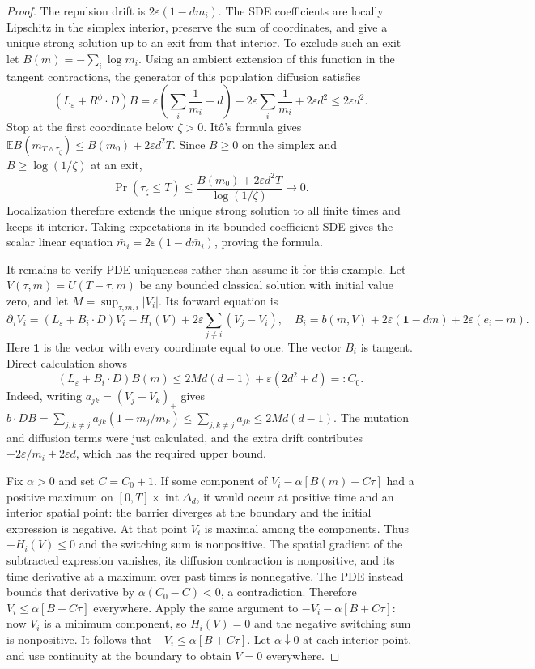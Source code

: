 \documentclass[11pt,a4paper]{article}
\theoremstyle{definition}
\theoremstyle{remark}
\begin{document}
\begin{proof}
The repulsion drift is $2\varepsilon(1-dm_i)$. The SDE coefficients are locally Lipschitz in the simplex interior, preserve the sum of coordinates, and give a unique strong solution up to an exit from that interior. To exclude such an exit let $B(m)=-\sum_i\log m_i$. Using an ambient extension of this function in the tangent contractions, the generator of this population diffusion satisfies
\[
 (L_\varepsilon+R^\phi\cdot D)B
 =\varepsilon\left(\sum_i\frac1{m_i}-d\right)
  -2\varepsilon\sum_i\frac1{m_i}+2\varepsilon d^2
 \leq2\varepsilon d^2.
\]
Stop at the first coordinate below $\zeta>0$. It\^o's formula gives
$\mathbb E B(m_{T\wedge\tau_\zeta})\leq B(m_0)+2\varepsilon d^2T$.
Since $B\geq0$ on the simplex and $B\geq\log(1/\zeta)$ at an exit,
\[
 \Pr(\tau_\zeta\leq T)\leq
 \frac{B(m_0)+2\varepsilon d^2T}{\log(1/\zeta)}\longrightarrow0.
\]
Localization therefore extends the unique strong solution to all finite times and keeps it interior. Taking expectations in its bounded-coefficient SDE gives the scalar linear equation $\dot{\bar m}_i=2\varepsilon(1-d\bar m_i)$, proving the formula.

It remains to verify PDE uniqueness rather than assume it for this example. Let $V(\tau,m)=U(T-\tau,m)$ be any bounded classical solution with initial value zero, and let $M=\sup_{\tau,m,i}|V_i|$. Its forward equation is
\[
 \partial_\tau V_i=(L_\varepsilon+B_i\cdot D)V_i-H_i(V)
            +2\varepsilon\sum_{j\ne i}(V_j-V_i),
 \quad B_i=b(m,V)+2\varepsilon(\mathbf1-dm)+2\varepsilon(e_i-m).
\]
Here $\mathbf1$ is the vector with every coordinate equal to one. The vector $B_i$ is tangent. Direct calculation shows
\[
 (L_\varepsilon+B_i\cdot D)B(m)
 \leq 2M d(d-1)+\varepsilon(2d^2+d)=:C_0.
\]
Indeed, writing $a_{jk}=(V_j-V_k)_+$ gives
$b\cdot DB=\sum_{j,k\ne j}a_{jk}(1-m_j/m_k)\leq\sum_{j,k\ne j}a_{jk}\leq2Md(d-1)$.
The mutation and diffusion terms were just calculated, and the extra drift contributes $-2\varepsilon/m_i+2\varepsilon d$, which has the required upper bound.

Fix $\alpha>0$ and set $C=C_0+1$. If some component of
$V_i-\alpha[B(m)+C\tau]$ had a positive maximum on $[0,T]\times\operatorname{int}\Delta_d$, it would occur at positive time and an interior spatial point: the barrier diverges at the boundary and the initial expression is negative. At that point $V_i$ is maximal among the components. Thus $-H_i(V)\leq0$ and the switching sum is nonpositive. The spatial gradient of the subtracted expression vanishes, its diffusion contraction is nonpositive, and its time derivative at a maximum over past times is nonnegative. The PDE instead bounds that derivative by $\alpha(C_0-C)<0$, a contradiction. Therefore $V_i\leq\alpha[B+C\tau]$ everywhere. Apply the same argument to $-V_i-\alpha[B+C\tau]$: now $V_i$ is a minimum component, so $H_i(V)=0$ and the negative switching sum is nonpositive. It follows that $-V_i\leq\alpha[B+C\tau]$. Let $\alpha\downarrow0$ at each interior point, and use continuity at the boundary to obtain $V=0$ everywhere.


\end{proof}
\end{document}
